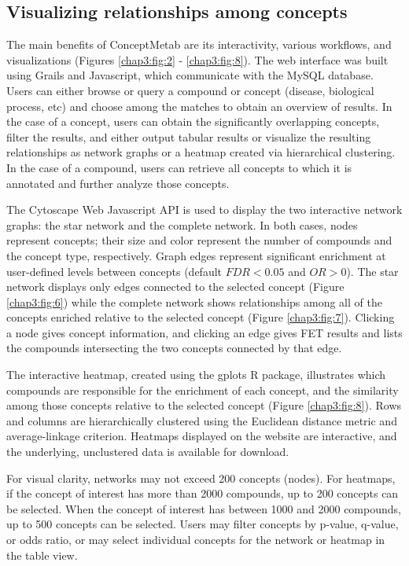 \subsection{Visualizing relationships among concepts}
\label{conceptmetab_methods_visualizing}

The main benefits of ConceptMetab are its interactivity, various workflows, and visualizations (Figures \ref{chap3:fig:2} - \ref{chap3:fig:8}). The web interface was built using Grails and Javascript, which communicate with the MySQL database. Users can either browse or query a compound or concept (disease, biological process, etc) and choose among the matches to obtain an overview of results. In the case of a concept, users can obtain the significantly overlapping concepts, filter the results, and either output tabular results or visualize the resulting relationships as network graphs or a heatmap created via hierarchical clustering. In the case of a compound, users can retrieve all concepts to which it is annotated and further analyze those concepts.

The Cytoscape Web Javascript API is used to display the two interactive network graphs: the star network and the complete network. In both cases, nodes represent concepts; their size and color represent the number of compounds and the concept type, respectively. Graph edges represent significant enrichment at user-defined levels between concepts (default $FDR < 0.05$ and $OR > 0$). The star network displays only edges connected to the selected concept (Figure \ref{chap3:fig:6}) while the complete network shows relationships among all of the concepts enriched relative to the selected concept (Figure \ref{chap3:fig:7}). Clicking a node gives concept information, and clicking an edge gives FET results and lists the compounds intersecting the two concepts connected by that edge.

The interactive heatmap, created using the gplots R package, illustrates which compounds are responsible for the enrichment of each concept, and the similarity among those concepts relative to the selected concept (Figure \ref{chap3:fig:8}). Rows and columns are hierarchically clustered using the Euclidean distance metric and average-linkage criterion. Heatmaps displayed on the website are interactive, and the underlying, unclustered data is available for download.

For visual clarity, networks may not exceed 200 concepts (nodes). For heatmaps, if the concept of interest has more than 2000 compounds, up to 200 concepts can be selected. When the concept of interest has between 1000 and 2000 compounds, up to 500 concepts can be selected. Users may filter concepts by p-value, q-value, or odds ratio, or may select individual concepts for the network or heatmap in the table view.


